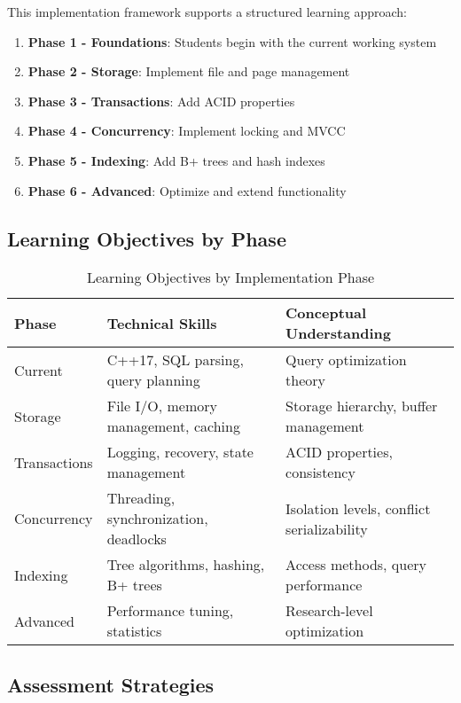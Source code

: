 \documentclass[12pt,a4paper]{article}
\begin{document}
This implementation framework supports a structured learning approach:

\begin{enumerate}
    \item \textbf{Phase 1 - Foundations}: Students begin with the current working system
    \item \textbf{Phase 2 - Storage}: Implement file and page management
    \item \textbf{Phase 3 - Transactions}: Add ACID properties
    \item \textbf{Phase 4 - Concurrency}: Implement locking and MVCC
    \item \textbf{Phase 5 - Indexing}: Add B+ trees and hash indexes
    \item \textbf{Phase 6 - Advanced}: Optimize and extend functionality
\end{enumerate}

\subsection{Learning Objectives by Phase}

\begin{table}[htbp]
\centering
\caption{Learning Objectives by Implementation Phase}
\label{tab:learning}
\begin{tabular}{p{2cm}p{5cm}p{5cm}}
\toprule
\textbf{Phase} & \textbf{Technical Skills} & \textbf{Conceptual Understanding} \\
\midrule
Current & C++17, SQL parsing, query planning & Query optimization theory \\
Storage & File I/O, memory management, caching & Storage hierarchy, buffer management \\
Transactions & Logging, recovery, state management & ACID properties, consistency \\
Concurrency & Threading, synchronization, deadlocks & Isolation levels, conflict serializability \\
Indexing & Tree algorithms, hashing, B+ trees & Access methods, query performance \\
Advanced & Performance tuning, statistics & Research-level optimization \\
\bottomrule
\end{tabular}
\end{table}

\subsection{Assessment Strategies}
\end{document}
